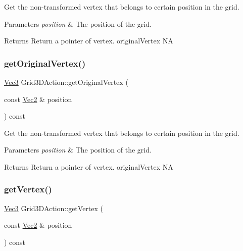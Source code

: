 Get the non-\/transformed vertex that belongs to certain position in the grid. 


\begin{DoxyParams}{Parameters}
{\em position} & The position of the grid. \\
\hline
\end{DoxyParams}
\begin{DoxyReturn}{Returns}
Return a pointer of vertex.  original\+Vertex  NA 
\end{DoxyReturn}
\mbox{\label{classGrid3DAction_a8e614d5c3c368b1f2eee4a3e885f861f}} 
\subsubsection{\texorpdfstring{get\+Original\+Vertex()}{getOriginalVertex()}\hspace{0.1cm}{\footnotesize\ttfamily [2/2]}}
{\footnotesize\ttfamily \hyperlink{classVec3}{Vec3} Grid3\+D\+Action\+::get\+Original\+Vertex (\begin{DoxyParamCaption}\item[{const \hyperlink{classVec2}{Vec2} \&}]{position }\end{DoxyParamCaption}) const}



Get the non-\/transformed vertex that belongs to certain position in the grid. 


\begin{DoxyParams}{Parameters}
{\em position} & The position of the grid. \\
\hline
\end{DoxyParams}
\begin{DoxyReturn}{Returns}
Return a pointer of vertex.  original\+Vertex  NA 
\end{DoxyReturn}
\mbox{\label{classGrid3DAction_a188dfc79a323f07b3aff441bced64201}} 
\subsubsection{\texorpdfstring{get\+Vertex()}{getVertex()}\hspace{0.1cm}{\footnotesize\ttfamily [1/2]}}
{\footnotesize\ttfamily \hyperlink{classVec3}{Vec3} Grid3\+D\+Action\+::get\+Vertex (\begin{DoxyParamCaption}\item[{const \hyperlink{classVec2}{Vec2} \&}]{position }\end{DoxyParamCaption}) const}



